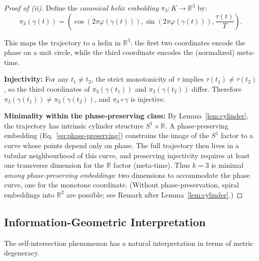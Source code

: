 \documentclass[12pt]{article}
\newcommand{\R}{\mathbb{R}}
\begin{document}
\begin{proof}[Proof of (ii)]
Define the \emph{canonical helix embedding} $\pi_3: K \to \R^3$ by:
\begin{equation}\label{eq:helix}
    \pi_3(\gamma(t)) = \left(\cos(2\pi \varphi(\gamma(t))), \sin(2\pi \varphi(\gamma(t))), \frac{\tau(t)}{T}\right).
\end{equation}

This maps the trajectory to a helix in $\R^3$: the first two coordinates encode the phase on a unit circle, while the third coordinate encodes the (normalized) meta-time.

\textbf{Injectivity:} For any $t_1 \neq t_2$, the strict monotonicity of $\tau$ implies $\tau(t_1) \neq \tau(t_2)$, so the third coordinates of $\pi_3(\gamma(t_1))$ and $\pi_3(\gamma(t_2))$ differ. Therefore $\pi_3(\gamma(t_1)) \neq \pi_3(\gamma(t_2))$, and $\pi_3 \circ \gamma$ is injective.

\textbf{Minimality within the phase-preserving class:} By Lemma~\ref{lem:cylinder}, the trajectory has intrinsic cylinder structure $S^1 \times \R$. A phase-preserving embedding (Eq.~\ref{eq:phase-preserving}) constrains the image of the $S^1$ factor to a curve whose points depend only on phase. The full trajectory then lives in a tubular neighbourhood of this curve, and preserving injectivity requires at least one transverse dimension for the $\R$ factor (meta-time). Thus $k = 3$ is minimal \emph{among phase-preserving embeddings}: two dimensions to accommodate the phase curve, one for the monotone coordinate. (Without phase-preservation, spiral embeddings into $\R^2$ are possible; see Remark after Lemma~\ref{lem:cylinder}.)
\end{proof}

\subsection{Information-Geometric Interpretation}

The self-intersection phenomenon has a natural interpretation in terms of metric degeneracy.
\end{document}
